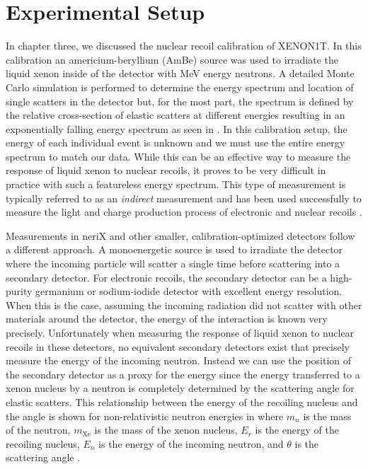 \section{Experimental Setup}
\label{sec:nerix_expt_setup}

In chapter three, we discussed the nuclear recoil calibration of XENON1T.  In this calibration an americium-beryllium (AmBe) source was used to irradiate the liquid xenon inside of the detector with MeV energy neutrons.  A detailed Monte Carlo simulation is performed to determine the energy spectrum and location of single scatters in the detector but, for the most part, the spectrum is defined by the relative cross-section of elastic scatters at different energies resulting in an exponentially falling energy spectrum as seen in .  In this calibration setup, the energy of each individual event is unknown and we must use the entire energy spectrum to match our data.  While this can be an effective way to measure the response of liquid xenon to nuclear recoils, it proves to be very difficult in practice with such a featureless energy spectrum.  This type of measurement is typically referred to as an \textit{indirect} measurement and has been used successfully to measure the light and charge production process of electronic and nuclear recoils \cite{aprile2013response, akerib2016tritium, aprile2017tritium}.

Measurements in neriX and other smaller, calibration-optimized detectors follow a different approach.  A monoenergetic source is used to irradiate the detector where the incoming particle will scatter a single time before scattering into a secondary detector.  For electronic recoils, the secondary detector can be a high-purity germanium or sodium-iodide detector with excellent energy resolution.  When this is the case, assuming the incoming radiation did not scatter with other materials around the detector, the energy of the interaction is known very precisely.  Unfortunately when measuring the response of liquid xenon to nuclear recoils in these detectors, no equivalent secondary detectors exist that precisely measure the energy of the incoming neutron.  Instead we can use the position of the secondary detector as a proxy for the energy since the energy transferred to a xenon nucleus by a neutron is completely determined by the scattering angle for elastic scatters.  This relationship between the energy of the recoiling nucleus and the angle is shown for non-relativistic neutron energies in  where $m_n$ is the mass of the neutron, $m_{\textrm{Xe}}$ is the mass of the xenon nucleus, $E_r$ is the energy of the recoiling nucleus, $E_n$ is the energy of the incoming neutron, and $\theta$ is the scattering angle \cite{knoll2010radiation}.

